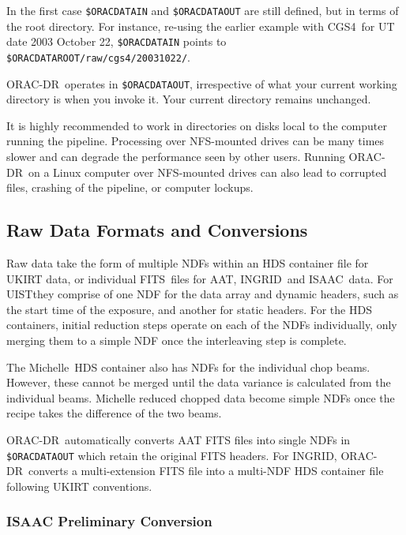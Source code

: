 \documentclass[twoside,11pt]{article}
\newcommand{\htmladdnormallink}[2]{#1}
\newcommand{\xref}[3]{#1}
\newcommand{\xlabel}[1]{}
\renewcommand{\_}{\texttt{\symbol{95}}}
\newcommand{\ORACDR}{{\footnotesize ORAC-DR}}
\newcommand{\FITSref}{\htmladdnormallink{FITS}{http://fits.gsfc.nasa.gov/}}
\newcommand{\AAT}{\htmladdnormallink{AAT}{http://www.aao.gov.au/}}
\newcommand{\INGRID}{\htmladdnormallink{INGRID}{http://www.ing.iac.es/Astronomy/instruments/ingrid/}}
\newcommand{\ISAAC}{\htmladdnormallink{ISAAC}{http://www.eso.org/instruments/isaac/}}
\newcommand{\Michelle}{\htmladdnormallink{Michelle}{http://www.jach.hawaii.edu/JACpublic/UKIRT/instruments/michelle/michelle.html}}
\newcommand{\UIST}{\htmladdnormallink{UIST}{http://www.jach.hawaii.edu/JACpublic/UKIRT/instruments/uist/uist.html}}
\newcommand{\CGS}{\htmladdnormallink{CGS4}{http://www.jach.hawaii.edu/JACpublic/UKIRT/instruments/cgs4/cgs4.html}}
\begin{document}
In the first case {\tt \$ORAC\_DATA\_IN} and {\tt \$ORAC\_DATA\_OUT}
are still defined, but in terms of the root directory. For instance,
re-using the earlier example with \CGS\ for UT date 2003 October 22,
{\tt \$ORAC\_DATA\_IN} points to {\tt \$ORAC\_DATA\_ROOT/raw/cgs4/20031022/}.

\ORACDR\ operates in {\tt \$ORAC\_DATA\_OUT}, irrespective of
what your current working directory is when you invoke it. Your
current directory remains unchanged.

It is highly recommended to work in directories on disks local to
the computer running the pipeline. Processing over NFS-mounted drives
can be many times slower and can degrade the performance seen by
other users. Running \ORACDR\ on a Linux computer over NFS-mounted
drives can also lead to corrupted files, crashing of the pipeline,
or computer lockups.

\subsection{\xlabel{raw_data_formats_and_conversions}Raw Data
Formats and Conversions\label{raw_data_formats_and_conversions}}

Raw data take the form of multiple NDFs within an
\xref{HDS container file}{sun92}{} for UKIRT data, or individual
\FITSref\ files for \AAT, \INGRID\ and \ISAAC\ data. For \UIST they
comprise of one NDF for the data array and dynamic headers, such
as the start time of the exposure, and another for static headers.
For the HDS containers, initial reduction steps operate on each of
the NDFs individually, only merging them to a simple NDF once the
interleaving step is complete.

The \Michelle\ HDS container also has NDFs for the individual chop
beams. However, these cannot be merged until the data variance
is calculated from the individual beams. Michelle reduced chopped
data become simple NDFs once the recipe takes the difference of the
two beams.

\ORACDR\ automatically converts AAT FITS files into single NDFs in
{\tt \$ORAC\_DATA\_OUT} which retain the original FITS headers.
For INGRID, \ORACDR\ converts a multi-extension FITS file into
a multi-NDF HDS container file following UKIRT conventions.

\subsubsection{\xlabel{isaac_preliminary_conversion}ISAAC Preliminary
Conversion\label{isaac_preliminary_conversion}}
\end{document}
